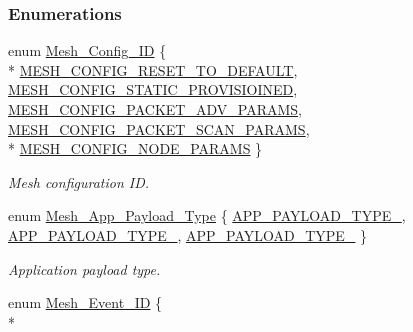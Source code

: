 \subsubsection*{Enumerations}
\begin{DoxyCompactItemize}
\item 
enum \hyperlink{group___m_e_s_h_ga86e1f14d530a66d2094810f666ce76f4}{Mesh\+\_\+\+Config\+\_\+\+ID} \{ \\*
\hyperlink{group___m_e_s_h_gga86e1f14d530a66d2094810f666ce76f4a9a4f7687bacc481b129108a77872fe7e}{M\+E\+S\+H\+\_\+\+C\+O\+N\+F\+I\+G\+\_\+\+R\+E\+S\+E\+T\+\_\+\+T\+O\+\_\+\+D\+E\+F\+A\+U\+LT}, 
\hyperlink{group___m_e_s_h_gga86e1f14d530a66d2094810f666ce76f4ab57bd889b70f0aa51a3491b2ed9463db}{M\+E\+S\+H\+\_\+\+C\+O\+N\+F\+I\+G\+\_\+\+S\+T\+A\+T\+I\+C\+\_\+\+P\+R\+O\+V\+I\+S\+I\+O\+I\+N\+ED}, 
\hyperlink{group___m_e_s_h_gga86e1f14d530a66d2094810f666ce76f4a813ab3683bfac9f130631454b9ec5b60}{M\+E\+S\+H\+\_\+\+C\+O\+N\+F\+I\+G\+\_\+\+P\+A\+C\+K\+E\+T\+\_\+\+A\+D\+V\+\_\+\+P\+A\+R\+A\+MS}, 
\hyperlink{group___m_e_s_h_gga86e1f14d530a66d2094810f666ce76f4af16c6c8a7784c6115fcdd9c96c0273e1}{M\+E\+S\+H\+\_\+\+C\+O\+N\+F\+I\+G\+\_\+\+P\+A\+C\+K\+E\+T\+\_\+\+S\+C\+A\+N\+\_\+\+P\+A\+R\+A\+MS}, 
\\*
\hyperlink{group___m_e_s_h_gga86e1f14d530a66d2094810f666ce76f4a9f11ef5e9f7ffa69ef21814e79529701}{M\+E\+S\+H\+\_\+\+C\+O\+N\+F\+I\+G\+\_\+\+N\+O\+D\+E\+\_\+\+P\+A\+R\+A\+MS}
 \}\begin{DoxyCompactList}\small\item\em Mesh configuration ID. \end{DoxyCompactList}
\item 
enum \hyperlink{group___m_e_s_h_ga0493e3955ac50fa886c012769544fe89}{Mesh\+\_\+\+App\+\_\+\+Payload\+\_\+\+Type} \{ \hyperlink{group___m_e_s_h_gga0493e3955ac50fa886c012769544fe89a0c3413a282753c08fdf290e10407d991}{A\+P\+P\+\_\+\+P\+A\+Y\+L\+O\+A\+D\+\_\+\+T\+Y\+P\+E\+\_}, 
\hyperlink{group___m_e_s_h_gga0493e3955ac50fa886c012769544fe89a92fbbbe7a45d88230a1a344304446598}{A\+P\+P\+\_\+\+P\+A\+Y\+L\+O\+A\+D\+\_\+\+T\+Y\+P\+E\+\_}, 
\hyperlink{group___m_e_s_h_gga0493e3955ac50fa886c012769544fe89ab6ed48a7ff81c76ae976e4d1ada027fe}{A\+P\+P\+\_\+\+P\+A\+Y\+L\+O\+A\+D\+\_\+\+T\+Y\+P\+E\+\_}
 \}\begin{DoxyCompactList}\small\item\em Application payload type. \end{DoxyCompactList}
\item 
enum \hyperlink{group___m_e_s_h_gaa213f0dfb25460197ad32e6ab1921f66}{Mesh\+\_\+\+Event\+\_\+\+ID} \{ \\*

\end{DoxyCompactItemize}
